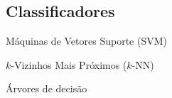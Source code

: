 \subsection{Classificadores}
\begin{frame}{Máquinas de Vetores Suporte (SVM)}
\end{frame}

\begin{frame}{$k$-Vizinhos Mais Próximos ($k$-NN)}
\end{frame}

\begin{frame}{Árvores de decisão}
\end{frame}